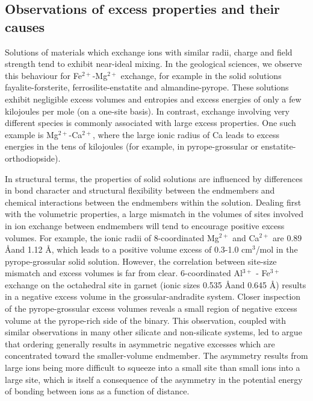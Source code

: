 \subsection{Observations of excess properties and their causes}

Solutions of materials which exchange ions with similar radii, charge and field strength tend to exhibit near-ideal mixing. In the geological sciences, we observe this behaviour for Fe$^{2+}$-Mg$^{2+}$ exchange, for example in the solid solutions fayalite-forsterite, ferrosilite-enstatite and almandine-pyrope. These solutions exhibit negligible excess volumes and entropies and excess energies of only a few kilojoules per mole (on a one-site basis). In contrast, exchange involving very different species is commonly associated with large excess properties. One such example is Mg$^{2+}$-Ca$^{2+}$, where the large ionic radius of Ca leads to excess energies in the tens of kilojoules (for example, in pyrope-grossular or enstatite-orthodiopside). 

In structural terms, the properties of solid solutions are influenced by differences in bond character and structural flexibility between the endmembers and chemical interactions between the endmembers within the solution. Dealing first with the volumetric properties, a large mismatch in the volumes of sites involved in ion exchange between endmembers will tend to encourage positive excess volumes. For example, the ionic radii of 8-coordinated Mg$^{2+}$ and Ca$^{2+}$ are 0.89 \AA and 1.12 \AA \citep{Shannon1976}, which leads to a positive volume excess of 0.3-1.0 cm$^3$/mol in the pyrope-grossular solid solution. However, the correlation between site-size mismatch and excess volumes is far from clear. 6-coordinated Al$^{3+}$ - Fe$^{3+}$ exchange on the octahedral site in garnet (ionic sizes 0.535 \AA and 0.645 \AA) results in a negative excess volume in the grossular-andradite system. Closer inspection of the pyrope-grossular excess volumes reveals a small region of negative excess volume at the pyrope-rich side of the binary. This observation, coupled with similar observations in many other silicate and non-silicate systems, led \cite{NW1980} to argue that ordering generally results in asymmetric negative excesses which are concentrated toward the smaller-volume endmember. The asymmetry results from large ions being more difficult to squeeze into a small site than small ions into a large site, which is itself a consequence of the asymmetry in the potential energy of bonding between ions as a function of distance.

